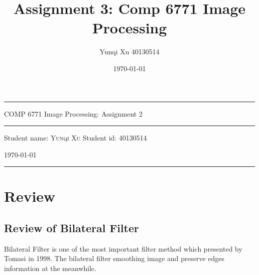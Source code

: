 \documentclass[12pt]{article}
\title{Assignment 3: Comp 6771 Image Processing}
\author{Yunqi Xu 40130514}
\date{\today}
\begin{document}

\begin{titlepage}
  \rule{\textwidth}{1pt}   %
    \vspace{0.2\textheight}  %


    {\Huge COMP 6771 Image Processing: Assignment 2}

    \vspace{0.025\textheight}   %

    \rule{0.83\textwidth}{0.4pt}  %

    \vspace{0.1\textheight}  %


    {\Large Student name: \textsc{Yunqi Xu}}
    \vfill
    {\Large Student id: 40130514}
    \vfill  %

    {\large \today}
    \vspace{0.1\textheight}  %


    \rule{\textwidth}{1pt}  %
\end{titlepage}

\section{Review}
\subsection{Review of Bilateral Filter}
Bilateral Filter is one of the most important filter method which presented by Tomasi in 1998. 
The bilateral filter smoothing image and preserve edges information at the meanwhile.
\end{document}
